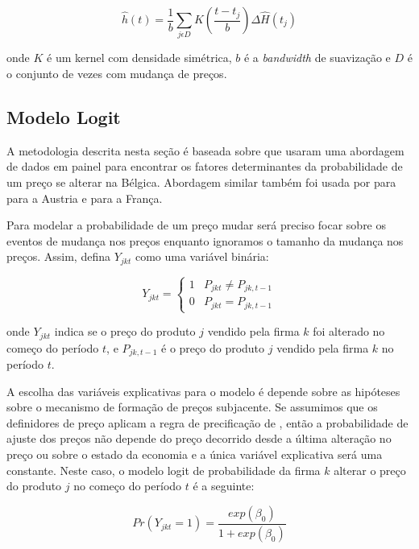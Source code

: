 \begin{algorithm}[H]
\begin{equation}\label{eq07en01}
\hat{h}\left(t \right)=\frac{1}{b}\sum_{j\epsilon D}{K}\left(\frac{t-{t}_{j}}{b}\right)\Delta \hat {H}\left({t}_{j}\right) 
\end{equation}

\noindent onde $K$ é um kernel com densidade simétrica, $b$ é a \emph{bandwidth} de suavização e $D$ é o conjunto de vezes com mudança de preços. 

\subsection{Modelo Logit}

A metodologia descrita nesta seção é baseada sobre \citet{aucremanne2005time} que usaram uma abordagem de dados em painel para encontrar os fatores determinantes da probabilidade de um preço se alterar na Bélgica. Abordagem similar também foi usada por \citet{lunnemann2005consumer} para \citet{baumgartner2005frequently} para a Austria e \citet{baudry2004price} para a França.

Para modelar a probabilidade de um preço mudar será preciso focar sobre os eventos de mudança nos preços enquanto ignoramos o tamanho da mudança nos preços. Assim, defina $Y_{jkt}$ como uma variável binária:

\begin{equation}\label{eq08en01}
Y_{jkt} =\begin{cases}1 &  P_{jkt} \neq P_{jk,t-1}\\0 & P_{jkt} = P_{jk,t-1}\end{cases}
\end{equation}

\noindent onde ${Y}_{jkt}$ indica se o preço do produto $j$ vendido pela firma $k$ foi alterado no começo do período $t$, e ${P}_{jk,t-1}$ é o preço do produto $j$ vendido pela firma $k$ no período $t$. 

A escolha das variáveis explicativas para o modelo é depende sobre as hipóteses sobre o mecanismo de formação de preços subjacente. Se assumimos que os definidores de preço aplicam a regra de precificação de \citet{calvo1983staggered}, então a probabilidade de ajuste dos preços não depende do preço decorrido desde a última alteração no preço ou sobre o estado da economia e a única variável explicativa será uma constante. Neste caso, o modelo logit de probabilidade da firma $k$ alterar o preço do produto $j$ no começo do período $t$ é a seguinte:

\begin{equation}\label{eq09en01}
Pr\left( { Y }_{ jkt }=1 \right) =\frac { exp\left( { \beta  }_{ 0 } \right)  }{ 1+exp\left( { \beta  }_{ 0 } \right)  } 
\end{equation}


\end{algorithm}
